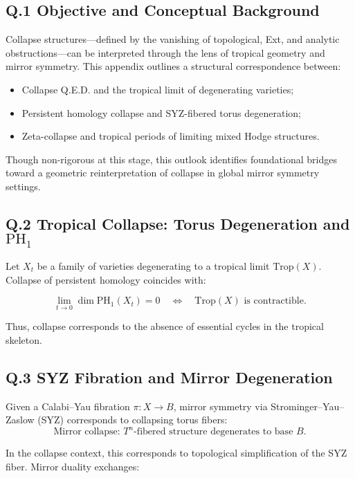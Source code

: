 \documentclass[11pt]{article}
\begin{document}
\subsection*{Q.1 Objective and Conceptual Background}

Collapse structures—defined by the vanishing of topological, Ext, and analytic obstructions—can be interpreted through the lens of tropical geometry and mirror symmetry. This appendix outlines a structural correspondence between:

\begin{itemize}
  \item Collapse Q.E.D. and the tropical limit of degenerating varieties;
  \item Persistent homology collapse and SYZ-fibered torus degeneration;
  \item Zeta-collapse and tropical periods of limiting mixed Hodge structures.
\end{itemize}

Though non-rigorous at this stage, this outlook identifies foundational bridges toward a geometric reinterpretation of collapse in global mirror symmetry settings.

\subsection*{Q.2 Tropical Collapse: Torus Degeneration and \(\mathrm{PH}_1\)}

Let \( X_t \) be a family of varieties degenerating to a tropical limit \( \mathrm{Trop}(X) \). Collapse of persistent homology coincides with:

\[
\lim_{t \to 0} \dim \mathrm{PH}_1(X_t) = 0
\quad \Longleftrightarrow \quad \mathrm{Trop}(X) \text{ is contractible}.
\]

Thus, collapse corresponds to the absence of essential cycles in the tropical skeleton.

\subsection*{Q.3 SYZ Fibration and Mirror Degeneration}

Given a Calabi–Yau fibration \( \pi: X \to B \), mirror symmetry via Strominger–Yau–Zaslow (SYZ) corresponds to collapsing torus fibers:
\[
\text{Mirror collapse: } T^n \text{-fibered structure degenerates to base } B.
\]

In the collapse context, this corresponds to topological simplification of the SYZ fiber. Mirror duality exchanges:
\end{document}
